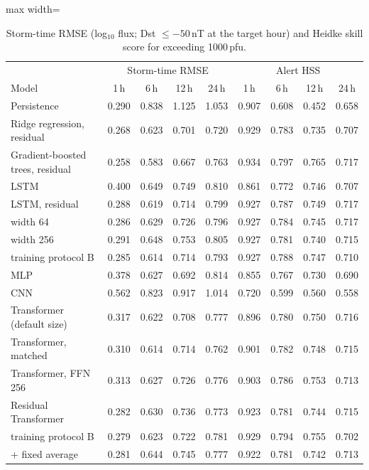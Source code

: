 \begin{table}[!t]
\centering
\caption{Storm-time RMSE (log$_{10}$ flux; Dst $\le -50$\,nT at the target hour) and Heidke skill score for exceeding 1000\,pfu.}
\label{tab:storm}
\footnotesize
\setlength{\tabcolsep}{4pt}
\begin{adjustbox}{max width=\linewidth}
\begin{tabular}{lcccccccc}
\toprule
 & \multicolumn{4}{c}{Storm-time RMSE} & \multicolumn{4}{c}{Alert HSS} \\
Model & 1\,h & 6\,h & 12\,h & 24\,h & 1\,h & 6\,h & 12\,h & 24\,h \\
\midrule
Persistence & 0.290 & 0.838 & 1.125 & 1.053 & 0.907 & 0.608 & 0.452 & 0.658 \\
Ridge regression, residual & 0.268 & 0.623 & 0.701 & 0.720 & 0.929 & 0.783 & 0.735 & 0.707 \\
Gradient-boosted trees, residual & 0.258 & 0.583 & 0.667 & 0.763 & 0.934 & 0.797 & 0.765 & 0.717 \\
LSTM & 0.400 & 0.649 & 0.749 & 0.810 & 0.861 & 0.772 & 0.746 & 0.707 \\
LSTM, residual & 0.288 & 0.619 & 0.714 & 0.799 & 0.927 & 0.787 & 0.749 & 0.717 \\
\quad width 64 & 0.286 & 0.629 & 0.726 & 0.796 & 0.927 & 0.784 & 0.745 & 0.717 \\
\quad width 256 & 0.291 & 0.648 & 0.753 & 0.805 & 0.927 & 0.781 & 0.740 & 0.715 \\
\quad training protocol B & 0.285 & 0.614 & 0.714 & 0.793 & 0.927 & 0.788 & 0.747 & 0.710 \\
MLP & 0.378 & 0.627 & 0.692 & 0.814 & 0.855 & 0.767 & 0.730 & 0.690 \\
CNN & 0.562 & 0.823 & 0.917 & 1.014 & 0.720 & 0.599 & 0.560 & 0.558 \\
Transformer (default size) & 0.317 & 0.622 & 0.708 & 0.777 & 0.896 & 0.780 & 0.750 & 0.716 \\
Transformer, matched & 0.310 & 0.614 & 0.714 & 0.762 & 0.901 & 0.782 & 0.748 & 0.715 \\
Transformer, FFN 256 & 0.313 & 0.627 & 0.726 & 0.776 & 0.903 & 0.786 & 0.753 & 0.713 \\
Residual Transformer & 0.282 & 0.630 & 0.736 & 0.773 & 0.923 & 0.781 & 0.744 & 0.715 \\
\quad training protocol B & 0.279 & 0.623 & 0.722 & 0.781 & 0.929 & 0.794 & 0.755 & 0.702 \\
\quad + fixed average & 0.281 & 0.644 & 0.745 & 0.777 & 0.922 & 0.781 & 0.742 & 0.713 \\

\end{tabular}
\end{adjustbox}
\end{table}
